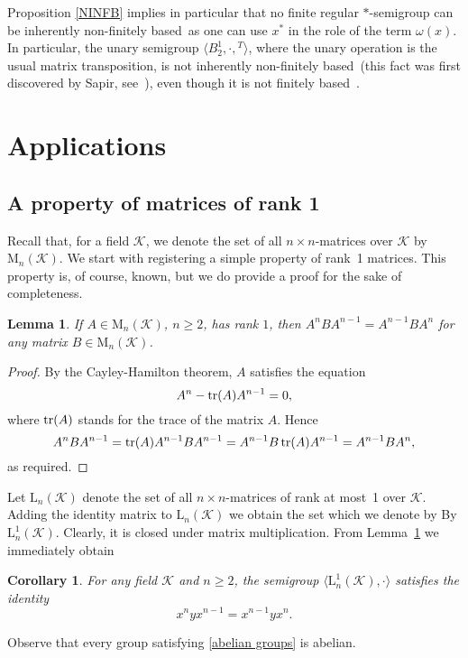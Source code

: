 \documentclass[11pt,reqno]{amsart}
\numberwithin{equation}{section}
\newtheorem{Lemma}[Thm]{Lemma}
\newtheorem{Cor}[Thm]{Corollary}
\theoremstyle{remark}
\def\om{\omega}
\def\fb{finitely based}
\begin{document}
Proposition \ref{NINFB} implies in particular that no finite regular $*$-semigroup can be inherently non-\fb\ as one
can use $x^*$ in the role of the term $\om(x)$. In particular, the unary semigroup $\langle B_2^1,\cdot,{}^T\rangle$,
where the unary operation is the usual matrix transposition, is not inherently non-\fb\ (this fact was first discovered
by Sapir, see~\cite{sapirinverse}), even though it is not finitely based~\cite{kleiman}.

\section{Applications}

\subsection{A property of matrices of rank 1}
Recall that, for a field $\mathcal{K}$, we denote the set of all
$n\times n$-matrices over $\mathcal{K}$ by
$\mathrm{M}_n(\mathcal{K})$. We start with registering a simple
property of rank~1 matrices. This property is, of course, known,
but we do provide a proof for the sake of completeness.
\begin{Lemma}
\label{rank 1} If $A\in\mathrm{M}_n(\mathcal{K})$, $n\ge2$, has
rank $1$, then $A^nBA^{n-1}=A^{n-1}BA^n$ for any matrix
$B\in\mathrm{M}_n(\mathcal{K})$.
\end{Lemma}

\begin{proof}
By the Cayley-Hamilton theorem, $A$ satisfies the equation
$$A^n-\operatorname{tr}(A)A^{n-1}=0,$$
where $\operatorname{tr}(A)$ stands for the trace of the matrix $A$. Hence
$$A^nBA^{n-1}=\operatorname{tr}(A)A^{n-1}BA^{n-1}=A^{n-1}B\operatorname{tr}(A)A^{n-1}=A^{n-1}BA^n,$$
as required.
\end{proof}

Let $\mathrm{L}_n(\mathcal{K})$ denote the set of all $n\times
n$-matrices of rank at most~1 over $\mathcal{K}$. Adding the
identity matrix to $\mathrm{L}_n(\mathcal{K})$ we obtain the set
which we denote by By $\mathrm{L}^1_n(\mathcal{K})$. Clearly, it
is closed under matrix multiplication. From Lemma~\ref{rank 1} we
immediately obtain
\begin{Cor}
\label{identity for rank 1} For any field $\mathcal{K}$ and
$n\ge2$, the semigroup
$\langle\mathrm{L}^1_n(\mathcal{K}),\cdot\rangle$ satisfies the
identity
\begin{equation}
\label{abelian groups} x^nyx^{n-1}=x^{n-1}yx^n.
\end{equation}
\end{Cor}
Observe that every group satisfying \eqref{abelian groups} is
abelian.
\end{document}
